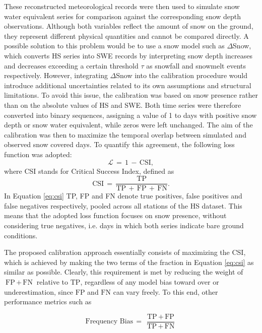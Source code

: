 These reconstructed meteorological records were then used to simulate snow water equivalent series for comparison against 
the corresponding snow depth observations. Although both variables reflect the amount of snow on the ground, they represent different physical 
quantities and cannot be compared directly. A possible solution to this problem would be to use a snow model such as $\Delta$Snow, which converts 
HS series into SWE records by interpreting snow depth increases and decreases exceeding a certain threshold $\tau$ as snowfall and snowmelt events 
respectively. However, integrating $\Delta$Snow into the calibration procedure would introduce additional uncertainties related to its own 
assumptions and structural limitations. To avoid this issue, the calibration was based on snow presence rather than on the 
absolute values of HS and SWE. Both time series were therefore converted into binary sequences, assigning a value of \num{1} to days with positive 
snow depth or snow water equivalent, while zeros were left unchanged. The aim of the calibration was then to maximize the temporal overlap between 
simulated and observed snow covered days. To quantify this agreement, the following loss function was adopted:
\begin{equation}
    \mathcal{L}\,=\,1\,-\,\text{CSI}, 
    \label{eq:loss_function}
\end{equation}
where CSI stands for Critical Success Index, defined as 
\begin{equation}
    \text{CSI}\,=\,\frac{\text{TP}}{\text{TP}\,+\,\text{FP}\,+\,\text{FN}}.
    \label{eq:csi}
\end{equation}
In Equation \eqref{eq:csi} TP, FP and FN denote true positives, false positives and false negatives respectively, pooled across all stations of the HS 
dataset. This means that the adopted loss function focuses on snow presence, without considering true negatives, i.e. days in which both series indicate 
bare ground conditions.

The proposed calibration approach essentially consists of maximizing the CSI, which is achieved by making the two terms of the fraction in Equation \ref{eq:csi} 
as similar as possible. Clearly, this requirement is met by reducing the weight of $\text{FP}\,+\,\text{FN}$ relative to $\text{TP}$, regardless of any 
model bias toward over or underestimation, since $\text{FP}$ and $\text{FN}$ can vary freely. To this end, other performance metrics such as 

\begin{equation}
    \text{Frequency Bias}\,=\,\frac{\text{TP}\,+\,\text{FP}}{\text{TP}\,+\,\text{FN}}
    \label{eq:freq_bias}
\end{equation}

